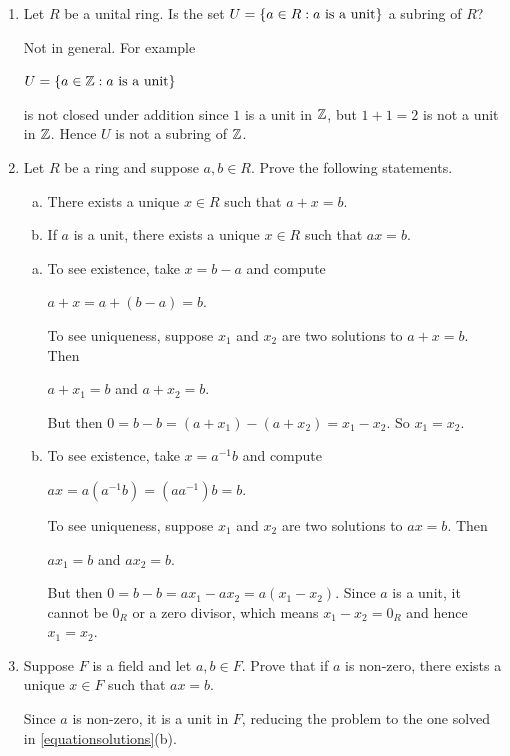 \documentclass[11pt,fleqn,dvipsnames,usenames]{article}
\begin{document}
\begin{enumerate}[1.]
\item Let $R$ be a unital ring.  Is the set $U = \left\{a\in R:a\text{ is a unit}\right\}$ a subring of $R$?
\vsmsp

\solution Not in general.  For example
\begin{center}
$U = \left\{a\in\mathbb{Z}:a\text{ is a unit}\right\}$
\end{center}
is not closed under addition since $1$ is a unit in $\mathbb{Z}$, but $1 + 1 = 2$ is not a unit in $\mathbb{Z}$.  Hence $U$ is not a subring of $\mathbb{Z}$.

\item \label{equationsolutions} Let $R$ be a ring and suppose $a,b\in R$.  Prove the following statements.
\begin{enumerate}[(a)]
\item There exists a unique $x\in R$ such that $a + x = b$.
\item If $a$ is a unit, there exists a unique $x\in R$ such that $ax=b$.   
\end{enumerate}
\vsmsp

\solution
\begin{enumerate}[(a)]
\item To see existence, take $x = b-a$ and compute
\begin{center}
$a + x = a + (b - a) = b$.
\end{center}
To see uniqueness, suppose $x_{1}$ and $x_{2}$ are two solutions to $a + x = b$.  Then
\begin{center}
$a + x_{1} = b$ and $a + x_{2} = b$.
\end{center}
But then $0 = b - b = (a + x_{1}) - (a + x_{2}) = x_{1} - x_{2}$. So $x_{1} = x_{2}$.

\item To see existence, take $x = a^{-1}b$ and compute
\begin{center}
$ax = a(a^{-1}b) = (aa^{-1})b = b$.
\end{center}
To see uniqueness, suppose $x_{1}$ and $x_{2}$ are two solutions to $ax = b$.  Then
\begin{center}
$ax_{1} = b$ and $ax_{2} = b$.
\end{center}
But then $0 = b - b = ax_{1} - ax_{2} = a(x_{1} - x_{2})$. Since $a$ is a unit, it cannot be $0_{R}$ or a zero divisor, which means $x_{1} - x_{2} = 0_{R}$ and hence $x_{1} = x_{2}$.
\end{enumerate}

\item Suppose $F$ is a field and let $a,b\in F$.  Prove that if $a$ is non-zero, there exists a unique $x\in F$ such that $ax = b$.
\vsmsp

\solution Since $a$ is non-zero, it is a unit in $F$, reducing the problem to the one solved in \ref{equationsolutions}(b). 
\end{enumerate}
\newpage
\end{document}

